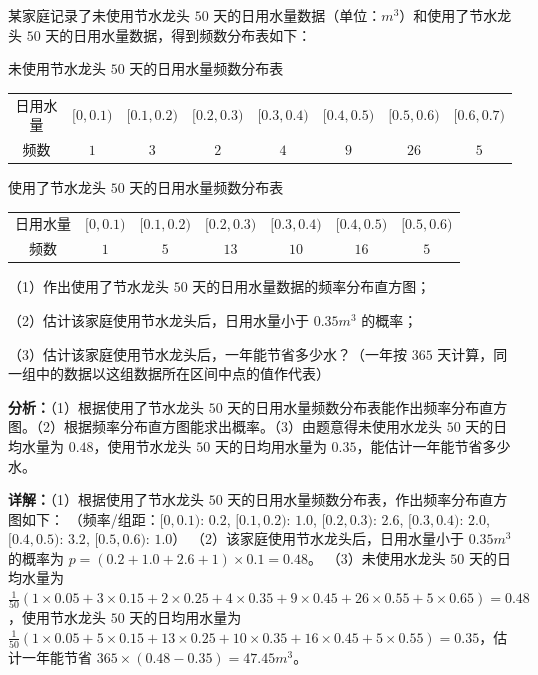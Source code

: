 \begin{question}[points=12]
某家庭记录了未使用节水龙头 $50$ 天的日用水量数据（单位：$m^3$）和使用了节水龙头 $50$ 天的日用水量数据，得到频数分布表如下：

未使用节水龙头 $50$ 天的日用水量频数分布表



\begin{center}

\begin{tabular}{cccccccc}

日用水量 & $[0,0.1)$ & $[0.1,0.2)$ & $[0.2,0.3)$ & $[0.3,0.4)$ & $[0.4,0.5)$ & $[0.5,0.6)$ & $[0.6,0.7)$  \\

频数 & $1$ & $3$ & $2$ & $4$ & $9$ & $26$ & $5$

\end{tabular}

\end{center}

使用了节水龙头 $50$ 天的日用水量频数分布表



\begin{center}

\begin{tabular}{ccccccc}

日用水量 & $[0,0.1)$ & $[0.1,0.2)$ & $[0.2,0.3)$ & $[0.3,0.4)$ & $[0.4,0.5)$ & $[0.5,0.6)$  \\

频数 & $1$ & $5$ & $13$ & $10$ & $16$ & $5$

\end{tabular}

\end{center}

（1）作出使用了节水龙头 $50$ 天的日用水量数据的频率分布直方图；

（2）估计该家庭使用节水龙头后，日用水量小于 $0.35m^3$ 的概率；

（3）估计该家庭使用节水龙头后，一年能节省多少水？（一年按 $365$ 天计算，同一组中的数据以这组数据所在区间中点的值作代表）
\begin{solution}

\textbf{分析：}（1）根据使用了节水龙头 $50$ 天的日用水量频数分布表能作出频率分布直方图。（2）根据频率分布直方图能求出概率。（3）由题意得未使用水龙头 $50$ 天的日均水量为 $0.48$，使用节水龙头 $50$ 天的日均用水量为 $0.35$，能估计一年能节省多少水。

\textbf{详解：}（1）根据使用了节水龙头 $50$ 天的日用水量频数分布表，作出频率分布直方图如下：
（频率/组距：$[0,0.1)$: $0.2$, $[0.1,0.2)$: $1.0$, $[0.2,0.3)$: $2.6$, $[0.3,0.4)$: $2.0$, $[0.4,0.5)$: $3.2$, $[0.5,0.6)$: $1.0$）
（2）该家庭使用节水龙头后，日用水量小于 $0.35m^3$ 的概率为 $p=(0.2+1.0+2.6+1)\times0.1=0.48$。
（3）未使用水龙头 $50$ 天的日均水量为 $\frac{1}{50}(1\times0.05+3\times0.15+2\times0.25+4\times0.35+9\times0.45+26\times0.55+5\times0.65)=0.48$，使用节水龙头 $50$ 天的日均用水量为 $\frac{1}{50}(1\times0.05+5\times0.15+13\times0.25+10\times0.35+16\times0.45+5\times0.55)=0.35$，估计一年能节省 $365\times(0.48-0.35)=47.45m^3$。
\end{solution}
\end{question}

